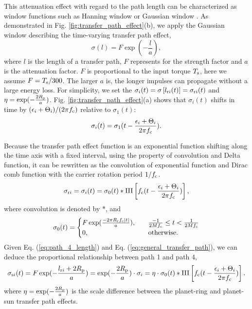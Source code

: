 \documentclass[a4paper,fleqn]{cas-sc}%
\begin{document}
\par This attenuation effect with regard to the path length can be characterized as window functions such as Hanning window or Gaussian window \cite{Mark2009}. As demonstrated in Fig. \ref{fig:transfer_path_effect}(b), we apply the Gaussian window describing the time-varying transfer path effect,
\begin{equation}
    \sigma(l)=F\exp\left(-\frac{l}{a}\right),\label{eq:general_transfer_path}
\end{equation}
where $l$ is the length of a transfer path, $F$ represents for the strength factor and $a$ is the attenuation factor. $F$ is proportional to the input torque $T_{\rm s}$, here we assume $F=T_{\rm s}/300$. The larger $a$ is, the longer impulses can propagate without a large energy loss. 
For simplicity, we set the $\sigma_i(t)=\sigma\left[l_{{\rm r}i}(t)\right]=\sigma_{{\rm r}i}(t)$ and $\eta=\exp(-\frac{2 R_{\rm p}}{a})$. Fig. \ref{fig:transfer_path_effect}(a) shows that $\sigma_{i}(t)$ shifts in time by $(\epsilon_i+\Theta_i)/(2 \pi f_{\rm c})$ relative to $\sigma_1(t)$:
\begin{equation}
    \sigma_{i}(t)=\sigma_{1}(t-\frac{\epsilon_i+\Theta_i}{2 \pi f_{\rm c}}).
\end{equation}
\par Because the transfer path effect function is an exponential function shifting along the time axis with a fixed interval, using the property of convolution and Delta function, it can be rewritten as the convolution of exponential function and Dirac comb function with the carrier rotation period $1/f_{\rm c}$.
\begin{equation}
    \sigma_{{\rm r}i}=\sigma_i(t)=\sigma_0(t) \ast \operatorname{III}\left[f_{\rm c} (t - \frac{\epsilon_i+\Theta_i}{2 \pi f_{\rm c}})\right],\label{eq:transfer_path_convolution_form}
\end{equation}
where convolution is denoted by $\ast$, and 
\begin{equation}
    \sigma_0(t)=\begin{cases}F \exp(\frac{- 2 \pi R_{\rm r} f_{\rm c} \left|t\right|}{a}),\quad &\frac{-1}{2 M f_{\rm c}} \leq t < \frac{1}{2 M f_{\rm c}}\\
        0, &\text{otherwise}.
    \end{cases}\label{eq:tranfer_path_time_shape}
\end{equation}
Given Eq. (\ref{eq:path_4_length}) and Eq. (\ref{eq:general_transfer_path}), we can deduce the proportional relationship between path 1 and path 4,
\begin{equation}
    \sigma_{{\rm s}i}(t)=F\exp(-\frac{l_{{\rm r}i}+2 R_{\rm p}}{a})=\exp(-\frac{2 R_{\rm p}}{a}) \cdot \sigma_i= \eta \cdot \sigma_0(t) \ast \operatorname{III}\left[f_{\rm c} (t - \frac{\epsilon_i+\Theta_i}{2 \pi f_{\rm c}})\right].
\end{equation}
where $\eta=\exp(-\frac{2 R_{\rm p}}{a})$ is the scale difference between the planet-ring and planet-sun transfer path effects.
\end{document}
